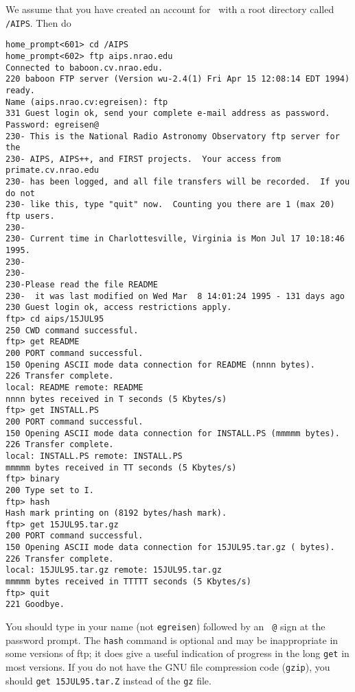 We assume that you have created an account for \AIPS\ with a root
directory called \hbox{{\tt /AIPS}}.  Then do
\vskip -10pt
\begin{verbatim}
home_prompt<601> cd /AIPS
home_prompt<602> ftp aips.nrao.edu
Connected to baboon.cv.nrao.edu.
220 baboon FTP server (Version wu-2.4(1) Fri Apr 15 12:08:14 EDT 1994) ready.
Name (aips.nrao.cv:egreisen): ftp
331 Guest login ok, send your complete e-mail address as password.
Password: egreisen@
230- This is the National Radio Astronomy Observatory ftp server for the
230- AIPS, AIPS++, and FIRST projects.  Your access from primate.cv.nrao.edu
230- has been logged, and all file transfers will be recorded.  If you do not
230- like this, type "quit" now.  Counting you there are 1 (max 20) ftp users.
230-
230- Current time in Charlottesville, Virginia is Mon Jul 17 10:18:46 1995.
230-
230-
230-Please read the file README
230-  it was last modified on Wed Mar  8 14:01:24 1995 - 131 days ago
230 Guest login ok, access restrictions apply.
ftp> cd aips/15JUL95
250 CWD command successful.
ftp> get README
200 PORT command successful.
150 Opening ASCII mode data connection for README (nnnn bytes).
226 Transfer complete.
local: README remote: README
nnnn bytes received in T seconds (5 Kbytes/s)
ftp> get INSTALL.PS
200 PORT command successful.
150 Opening ASCII mode data connection for INSTALL.PS (mmmmm bytes).
226 Transfer complete.
local: INSTALL.PS remote: INSTALL.PS
mmmmm bytes received in TT seconds (5 Kbytes/s)
ftp> binary
200 Type set to I.
ftp> hash
Hash mark printing on (8192 bytes/hash mark).
ftp> get 15JUL95.tar.gz
200 PORT command successful.
150 Opening ASCII mode data connection for 15JUL95.tar.gz ( bytes).
226 Transfer complete.
local: 15JUL95.tar.gz remote: 15JUL95.tar.gz
mmmmm bytes received in TTTTT seconds (5 Kbytes/s)
ftp> quit
221 Goodbye.
\end{verbatim}
\vskip -10pt
You should type in your name (not {\tt egreisen}) followed by an {\tt
@} sign at the password prompt.  The {\tt hash} command is optional
and may be inappropriate in some versions of ftp; it does give a
useful indication of progress in the long {\tt get} in most versions.
If you do not have the GNU file compression code ({\tt gzip}), you
should {\tt get 15JUL95.tar.Z} instead of the {\tt gz} file.

\vfill\eject

